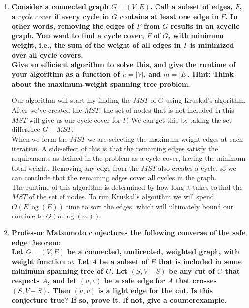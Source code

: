 \documentclass{article}
\begin{document}
\begin{enumerate}
\item \textbf{Consider a connected graph $G = (V,E)$. Call a subset of edges, $F$, a $cycle$ $cover$ if every cycle in $G$ contains at least one edge in $F$. In other words, removing the edges of $F$ from $G$ results in an acyclic graph. You want to find a cycle cover, $F$ of $G$, with minimum weight, i.e., the sum of the weight of all edges in $F$ is minimized over all cycle covers.} \\
\textbf{Give an efficient algorithm to solve this, and give the runtime of your algorithm as a function of $n = |V|$, and $m = |E|$. Hint: Think about the maximum-weight spanning tree problem.} \\
\newline 

Our algorithm will start my finding the $MST$ of $G$ using Kruskal's algorithm. After we've created the $MST$, the set of nodes that is not included in this $MST$ will give us our cycle cover for $F$. We can get this by taking the set difference $G - MST$. \\
\newline 
When we form the $MST$ we are selecting the maximum weight edges at each iteration. A side-effect of this is that the remaining edges satisfy the requirements as defined in the problem as a cycle cover, having the minimum total weight. Removing any edge from the $MST$ also creates a cycle, so we can conclude that the remaining edges cover all cycles in the graph. \\
\newline
The runtime of this algorithm is determined by how long it takes to find the $MST$ of the set of nodes. To run Kruskal's algorithm we will spend $O(E \log(E))$ time to sort the edges, which will ultimately bound our runtime to $O(m \log(m))$. 








\newpage
\item \textbf{ Professor Matsumoto conjectures the following converse of the safe edge theorem: } \\
\textbf{ Let $G = (V,E)$ be a connected, undirected, weighted graph, with weight function $w$. Let $A$ be a subset of $E$ that is included in some minimum spanning tree of $G$. Let $(S, V-S)$ be any cut of $G$ that respects $A$, and let $(u,v)$ be a safe edge for $A$ that crosses $(S, V-S)$. Then $(u,v)$ is a light edge for the cut. Is this conjecture true? If so, prove it. If not, give a counterexample. } \\


\end{enumerate}
\end{document}
